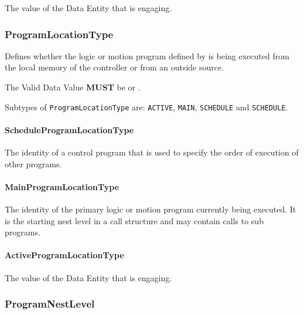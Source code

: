The value of the \gls{Data Entity} that is engaging.


\subsubsection{ProgramLocationType}
\label{sec:ProgramLocationType}



Defines whether the logic or motion program defined by  is being executed from the local memory of the controller or from an outside source.
  
 The \gls{Valid Data Value} \textbf{MUST} be  or .


Subtypes of \texttt{ProgramLocationType} are: \texttt{ACTIVE}, \texttt{MAIN}, \texttt{SCHEDULE} and \texttt{SCHEDULE}. 
\FloatBarrier

\paragraph{ScheduleProgramLocationType}\mbox{}
\label{sec:ScheduleProgramLocationType}



The identity of a control program that is used to specify the order of execution of other programs.


\paragraph{MainProgramLocationType}\mbox{}
\label{sec:MainProgramLocationType}



The identity of the primary logic or motion program currently being executed. It is the starting nest level in a call structure and may contain calls to sub programs.


\paragraph{ActiveProgramLocationType}\mbox{}
\label{sec:ActiveProgramLocationType}



The value of the \gls{Data Entity} that is engaging.


\subsubsection{ProgramNestLevel}
\label{sec:ProgramNestLevel}



